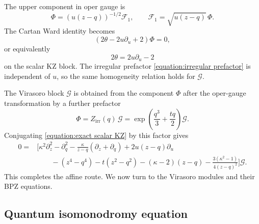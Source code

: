 \documentclass[a4paper,11pt]{article}
\newcommand{\cF}{\mathcal{F}}
\numberwithin{equation}{section}
\begin{document}
The upper component in oper gauge is
\begin{equation}
	\Phi
	=
	\left(u(z-q)\right)^{-1/2}\cF_{1},
	\qquad
	\cF_{1}
	=
	\sqrt{u(z-q)}\,\Phi.
\end{equation}
The Cartan Ward identity becomes
\begin{equation}
	\label{equation:scalar Cartan Ward}
	\left(
	2\theta-2u\partial_{u}+2
	\right)\Phi
	=
	0,
\end{equation}
or equivalently
\begin{equation}
	2\theta=2u\partial_{u}-2
\end{equation}
on the scalar KZ block.  The irregular prefactor
\eqref{equation:irregular prefactor} is independent of $u$, so the same
homogeneity relation holds for $\mathcal{G}$.


The Virasoro block $\mathcal{G}$ is obtained from the component $\Phi$ after the
oper-gauge transformation by a further prefactor
\begin{equation}
	\label{equation:irregular prefactor}
	\Phi
	=
	Z_{\mathrm{irr}}(q)\,\mathcal{G}
	=
	\exp\left(\frac{q^{3}}{3}+\frac{tq}{2}\right)\mathcal{G}.
\end{equation}
Conjugating \eqref{equation:exact scalar KZ} by this factor gives
\begin{equation}
	\label{equation:physical combined scalar KZ}
	\begin{aligned}
		0={}&
		\Bigg[
		\kappa^{2}\partial_{z}^{2}
		-
		\partial_{q}^{2}
		-
		\frac{\kappa}{z-q}
		\left(
		\partial_{z}+\partial_{q}
		\right)
		+
		2u(z-q)\partial_{u}
		\\
		&\qquad
		-
		(z^{4}-q^{4})
		-
		t(z^{2}-q^{2})
		-
		(\kappa-2)(z-q)
		-
		\frac{3(\kappa^{2}-1)}{4(z-q)^{2}}
		\Bigg]\mathcal{G}.
	\end{aligned}
\end{equation}
This completes the affine route.  We now turn to the Virasoro modules and their BPZ equations.

\subsection{Quantum isomonodromy equation}
\label{subsection:PII original time connection}
\end{document}
